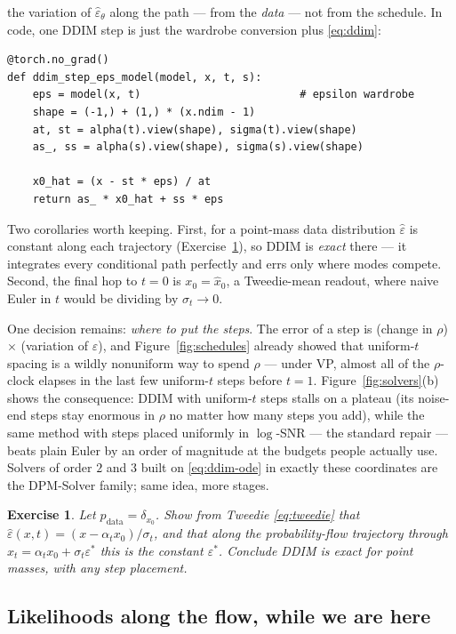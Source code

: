 \documentclass[10pt,a4paper]{article}
\newtheorem{exercise}{Exercise}
\newcommand{\veps}{\varepsilon}
\begin{document}
the variation of $\hat\veps_\theta$ along the path --- from the
\emph{data} --- not from the schedule. In code, one DDIM step is just
the wardrobe conversion plus \eqref{eq:ddim}:
\begin{lstlisting}
@torch.no_grad()
def ddim_step_eps_model(model, x, t, s):
    eps = model(x, t)                         # epsilon wardrobe
    shape = (-1,) + (1,) * (x.ndim - 1)
    at, st = alpha(t).view(shape), sigma(t).view(shape)
    as_, ss = alpha(s).view(shape), sigma(s).view(shape)

    x0_hat = (x - st * eps) / at
    return as_ * x0_hat + ss * eps
\end{lstlisting}
Two corollaries worth keeping.
First, for a point-mass data distribution $\hat\veps$ is constant along
each trajectory (Exercise~\ref{ex:ddim-exact}), so DDIM is \emph{exact}
there --- it integrates every conditional path perfectly and errs only
where modes compete. Second, the final hop to $t = 0$ is
$x_0 = \hat x_0$, a Tweedie-mean readout, where naive Euler in $t$
would be dividing by $\sigma_t \to 0$.

One decision remains: \emph{where to put the steps}. The error of a step
is (change in $\rho$) $\times$ (variation of $\hat\veps$), and
Figure~\ref{fig:schedules} already showed that uniform-$t$ spacing is a
wildly nonuniform way to spend $\rho$ --- under VP, almost all of the
$\rho$-clock elapses in the last few uniform-$t$ steps before $t = 1$.
Figure~\ref{fig:solvers}(b) shows the consequence: DDIM with uniform-$t$
steps stalls on a plateau (its noise-end steps stay enormous in $\rho$
no matter how many steps you add), while the same method with steps
placed uniformly in $\log$-SNR --- the standard repair --- beats plain
Euler by an order of magnitude at the budgets people actually use.
Solvers of order $2$ and $3$ built on \eqref{eq:ddim-ode} in exactly
these coordinates are the DPM-Solver family; same idea, more stages.

\begin{exercise}
\label{ex:ddim-exact}
Let $p_{\mathrm{data}} = \delta_{x_0}$. Show from Tweedie
\eqref{eq:tweedie} that $\hat\veps(x, t) = (x - \alpha_t x_0)/\sigma_t$,
and that along the probability-flow trajectory through
$x_t = \alpha_t x_0 + \sigma_t \veps^\ast$ this is the constant
$\veps^\ast$. Conclude DDIM is exact for point masses, with any step
placement.
\end{exercise}

\subsection{Likelihoods along the flow, while we are here}
\label{sec:likelihood}
\end{document}

